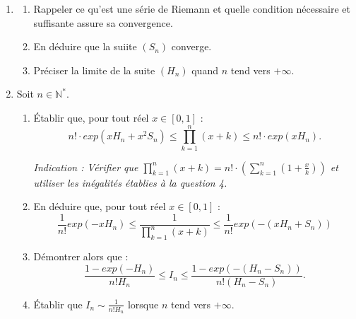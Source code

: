 \documentclass{article}
\begin{document}
\begin{paracol}{2}
{\begin{enumerate}
\begin{enumerate}
        \item Établir que, pour tout réel $t \in [0,1]$ :
        \[
            t - t^2 \leq \ln(1+t)
        \]
        puis que, pour tout réel $t \in [0,1]$ :
        \[
            e^{t - t^2} \leq 1 + t
        \]
    \end{enumerate}
    \switchcolumn
    \newpage
    Dans la suite, pour tout entier naturel $n$, on pose :
    \[
        H_n = \sum_{k=1}^n \frac{1}{k}, \quad S_n = \sum_{k=1}^n \frac{1}{k^2}.
    \]
    \setcounter{enumi}{4}
    
    \item 
    \begin{enumerate}
        \item Rappeler ce qu'est une série de Riemann et quelle condition nécessaire et suffisante assure sa convergence.
        
        \item En déduire que la suiite $(S_n)$ converge.
        
        \item Préciser la limite de la suite $(H_n)$ quand $n$ tend vers $+\infty$.
    \end{enumerate}
    
    \item Soit $n \in \mathbb{N}^*$.
    
    \begin{enumerate}
        \item Établir que, pour tout réel $x \in [0,1]$ :
        \[
            n! \cdot exp(xH_n + x^2 S_n) \leq \prod_{k=1}^n (x+k) \leq n! \cdot exp(xH_n).
        \]
        
        \textit{Indication : Vérifier que $\prod_{k=1}^n (x+k) = n! \cdot \left(\sum_{k=1}^n \left(1 + \frac{x}{k}\right)\right)$ et utiliser les inégalités établies à la question 4.}
        
        \item En déduire que, pour tout réel $x \in [0,1]$ :
        \[
            \frac{1}{n!} exp(-xH_n) \leq \frac{1}{\prod_{k=1}^n (x+k)} \leq \frac{1}{n!} exp(-(xH_n + S_n))
        \]

        \item Démontrer alors que :
        \[
            \frac{1 - exp(-H_n)}{n!H_n} \leq I_n \leq \frac{1 - exp(-(H_n - S_n))}{n!(H_n - S_n)}.
        \]

        \item Établir que $I_n \sim \frac{1}{n!H_n}$ lorsque $n$ tend vers $+\infty$.
    \end{enumerate}


\end{enumerate}}
\end{paracol}
\end{document}

